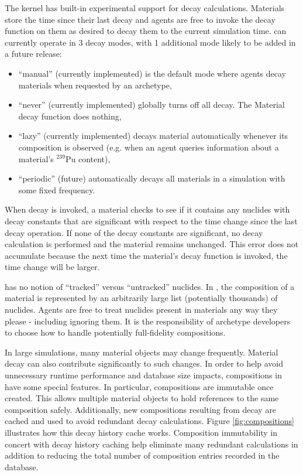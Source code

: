 The \Cyclus kernel has built-in experimental support for decay calculations.
Materials store the time since their last decay and agents are free to
invoke the decay function on them as desired to decay them to the current
simulation time. \Cyclus can currently operate in 3 decay modes, with 1 additional
mode likely to be added in a future release:

\begin{itemize}
    \item ``manual'' (currently implemented) is the default mode
        where agents decay materials when requested by an archetype,
    \item ``never'' (currently implemented) globally turns off all decay.
        The Material decay function does nothing,
    \item ``lazy'' (currently implemented) decays material automatically whenever
         its composition is observed (e.g. when an agent queries information
         about a material's $^{239}$Pu content),
    \item ``periodic'' (future) automatically decays all materials in a
        simulation with some fixed frequency.
\end{itemize}


When decay is invoked, a material checks to see if it contains any nuclides with
decay constants that are significant with respect to the time change since the
last decay operation.  If none of the decay constants are significant, no decay
calculation is performed and the material remains unchanged.  This error does
not accumulate because the next time the material's decay function is invoked,
the time change will be larger.

\Cyclus has no notion of ``tracked'' versus ``untracked'' nuclides.  In
\Cyclus, the composition of a material is represented by an arbitrarily large
list (potentially thousands) of nuclides.  Agents are free to treat nuclides
present in materials any way they please - including ignoring them.  It is the
responsibility of archetype developers to choose how to handle potentially
full-fidelity compositions.

In large simulations, many material objects may change frequently.  Material
decay can also contribute significantly to such changes.  In order to help
avoid unnecessary runtime performance and database size impacts, compositions
in \Cyclus have some special features.  In particular, compositions are
immutable once created. This allows multiple material objects to hold
references to the same composition safely.  Additionally, new compositions
resulting from decay are cached and used to avoid redundant decay
calculations.  Figure \ref{fig:compositions} illustrates how this decay
history cache works. Composition immutability in concert with decay history
caching help eliminate many redundant calculations in addition to reducing the
total number of composition entries recorded in the database.


